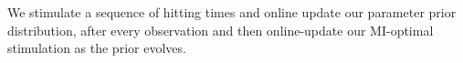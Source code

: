 \documentclass{article}
\begin{document}
% 
% 
% 
% 
We stimulate a sequence
of hitting times and online update our parameter prior distribution, after
every observation and then online-update our MI-optimal stimulation as the
prior evolves. 
\end{document}

